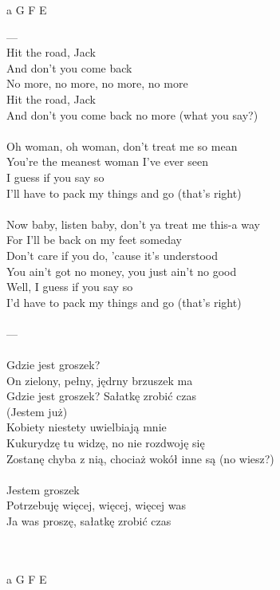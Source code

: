\documentclass[a5paper, 10pt]{book}
\begin{document}
\begin{minipage}[t]{0.2\textwidth}
a G F E\\
\end{minipage}
\newpage
\begin{minipage}[t]{0.8\textwidth}
---\\

Hit the road, Jack\\
And don't you come back\\
No more, no more, no more, no more\\
Hit the road, Jack\\
And don't you come back no more (what you say?)\\
\\
Oh woman, oh woman, don't treat me so mean\\
You're the meanest woman I've ever seen\\
I guess if you say so\\
I'll have to pack my things and go (that’s right)\\
\\
Now baby, listen baby, don't ya treat me this-a way\\
For I'll be back on my feet someday\\
Don't care if you do, 'cause it's understood\\
You ain't got no money, you just ain't no good\\
Well, I guess if you say so\\
I'd have to pack my things and go (that’s right)\\
\\
---\\
\\
Gdzie jest groszek?\\
On zielony, pełny, jędrny brzuszek ma\\
Gdzie jest groszek? Sałatkę zrobić czas\\

(Jestem już)\\
Kobiety niestety uwielbiają mnie\\
Kukurydzę tu widzę, no nie rozdwoję się\\
Zostanę chyba z nią, chociaż wokół inne są (no wiesz?)\\
\\
Jestem groszek\\
Potrzebuję więcej, więcej, więcej was\\
Ja was proszę, sałatkę zrobić czas\\
\end{minipage}
\begin{minipage}[t]{0.2\textwidth}
~\\
~\\
a G F E\\
\end{minipage}
\end{document}
